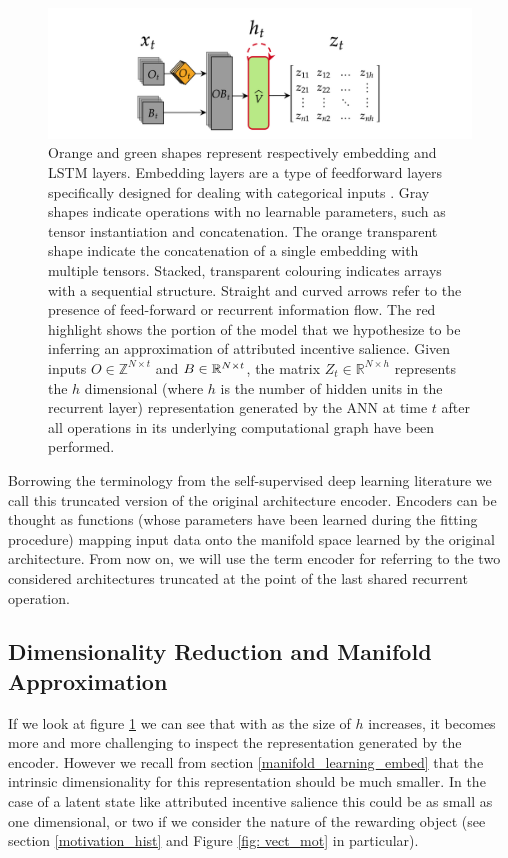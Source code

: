 \begin{figure}[!htb]
  \centering
  \includegraphics[width=\textwidth]{images/chapter_4/representation_extractor.png}
    \caption[\textbf{The procedure for generating latent representations generated by an ANN}]{Orange and green shapes represent respectively embedding and LSTM layers. Embedding layers are a type of feedforward layers specifically designed for dealing with categorical inputs \cite{chollet2015keras}. Gray shapes indicate operations with no learnable parameters, such as tensor instantiation and concatenation. The orange transparent shape indicate the concatenation of a single embedding with multiple tensors. Stacked, transparent colouring indicates arrays with a sequential structure. Straight and curved arrows refer to the presence of feed-forward or recurrent information flow. The red highlight shows the portion of the model that we hypothesize to be inferring an approximation of attributed incentive salience. Given inputs $O \in \mathbb{Z}^{N \times t}$ and $B \in \mathbb{R}^{N \times t \time 5}$, the matrix $Z_t \in \mathbb{R}^{N \times h}$ represents the $h$ dimensional (where $h$ is the number of hidden units in the recurrent layer) representation generated by the ANN at time $t$ after all operations in its underlying computational graph have been performed.}
    \label{fig: repr_extr}
\end{figure}

Borrowing the terminology from the self-supervised deep learning literature \cite{bengio2017deep} we call this truncated version of the original architecture encoder. Encoders can be thought as functions (whose parameters have been learned during the fitting procedure) mapping input data onto the manifold space learned by the original architecture. From now on, we will use the term encoder for referring to the two considered architectures truncated at the point of the last shared recurrent operation.

\subsection{Dimensionality Reduction and Manifold Approximation}
\label{dim_reduction}
If we look at figure \ref{fig: repr_extr} we can see that with as the size of $h$ increases, it becomes more and more challenging to inspect the representation generated by the encoder. However we recall from section \ref{manifold_learning_embed} that the intrinsic dimensionality for this representation should be much smaller. In the case of a latent state like attributed incentive salience this could be as small as one dimensional, or two if we consider the nature of the rewarding object (see section \ref{motivation_hist} and Figure \ref{fig: vect_mot} in particular). 

